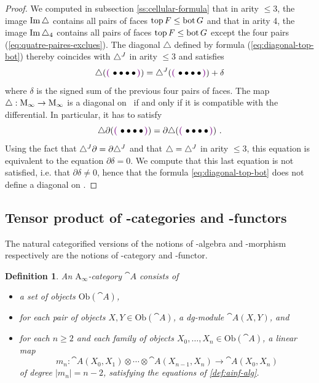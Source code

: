 \documentclass[twoside, 12pt]{amsart}
\newtheorem{definition}{Definition}[section]
\theoremstyle{remark}
\begin{document}
\begin{proof}
We computed in subsection \ref{ss:cellular-formula} that in arity $\leq 3$, the image $\operatorname{Im} \triangle$ contains all pairs of faces $\operatorname{top} F\leq \operatorname{bot} G$ and that in arity 4, the image $\operatorname{Im} \triangle_4$ contains all pairs of faces $\operatorname{top} F\leq \operatorname{bot} G$ except the four pairs (\ref{eq:quatre-paires-exclues}).
The diagonal $\triangle$ defined by formula (\ref{eq:diagonal-top-bot}) thereby coincides with $\triangle^{J}$ in arity $\leq 3$ and satisfies 
\[ \triangle ( \purple{ \bullet \bullet \bullet \bullet} ) = \diagminf ( \purple{ \bullet \bullet \bullet \bullet} ) + \delta \]
where $\delta$ is the signed sum of the previous four pairs of faces. 
The map $\triangle : \mathrm{M}_\infty \rightarrow \mathrm{M}_\infty$ is a diagonal on \Minf\ if and only if it is compatible with the differential. In particular, it has to satisfy
\[ \triangle \partial ( \purple{ \bullet \bullet \bullet \bullet} )  = \partial  \triangle (  \purple{ \bullet \bullet \bullet \bullet} )  \ . \]
Using the fact that $\triangle^{J} \partial = \partial \triangle^{J}$ and that $\triangle = \triangle^{J}$  in arity $\leq 3$, this equation is equivalent to the equation $\partial \delta = 0$. We compute that this last equation is not satisfied, i.e. that $\partial \delta \neq 0$, hence that the formula \ref{eq:diagonal-top-bot} does not define a diagonal on \Minf .
\end{proof}


\subsection{Tensor product of \Ainf -categories and \Ainf -functors}

The natural categorified versions of the notions of \Ainf -algebra and \Ainf -morphism respectively are the notions of \Ainf -category and \Ainf -functor.

\begin{definition} 
An $\mathrm{A}_\infty$-category $\cat{A}$ consists of 
\begin{itemize}[leftmargin=*]
  \item a set of objects $\mathrm{Ob}(\cat{A})$,
  \item for each pair of objects $X,Y \in \mathrm{Ob}(\cat{A})$, a dg-module $\cat{A}(X,Y)$, and
  \item for each $n\geq 2$ and each family of objects $X_0,\ldots,X_n \in \mathrm{Ob}(\cat{A})$, a linear map \[m_n : \cat{A}(X_0,X_1) \otimes \cdots \otimes \cat{A}(X_{n-1},X_n) \to \cat{A}(X_0,X_n)\] of degree $|m_n|=n-2$, satisfying the equations of \cref{def:ainf-alg}.
\end{itemize}
\end{definition}
\end{document}
